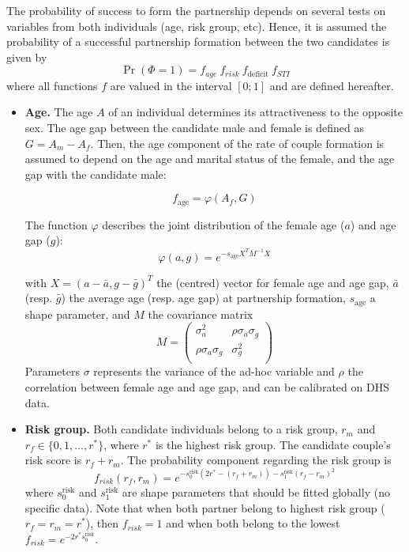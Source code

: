 \documentclass[11pt, onecolumn]{article}
\begin{document}
The probability of success to form the partnership depends on several tests on variables from both individuals (age, risk group, etc). Hence, it is assumed the probability of a successful partnership formation between the two candidates is given by
\begin{equation}
\label{probaFormation}
\Pr(\Phi=1) = f_{age}\ f_{risk}\ f_{\mathrm{deficit}}\ f_{STI}
\end{equation}
where all functions $f$ are valued in the interval $[0;1]$ and are defined hereafter.

\begin{itemize}

\item \textbf{Age.} The age $A$ of an individual determines its attractiveness to the opposite sex.
The age gap between the candidate male and female is defined as $G=A_m-A_f$. Then, the age component of the rate of couple formation is assumed to depend on the age and marital status of the female, and the age gap with the candidate male:

$$f_{\mathrm{age}}= \varphi(A_f,G) $$
 
The function $\varphi$ describes the joint distribution of the female age ($a$)  and age gap ($g$):
$$\varphi(a,g)=e^{-s_{\mathrm{age}} X^T M^{-1} X}$$

with $X=(a-\bar{a},g-\bar{g})^T$ the (centred) vector for female age and age gap, $\bar{a}$ (resp. $\bar{g}$) the average age (resp. age gap) at partnership formation, $s_{\mathrm{age}}$ a shape parameter, and $M$ the covariance matrix
$$M=\begin{pmatrix}
\sigma^2_{a} & \rho\sigma_{a}\sigma_{g} \\
\rho\sigma_{a}\sigma_{g} & \sigma^2_{g} \\
\end{pmatrix}$$
Parameters $\sigma$ represents the variance of the ad-hoc variable and $\rho$ the correlation between female age and age gap, and can be calibrated on DHS data.

\item \textbf{Risk group.} Both candidate individuals belong to a risk group, $r_m$ and $r_f\in \{0,1,...,r^*\}$, where $r^*$ is the highest risk group. The candidate couple's risk score is $r_f+r_m$. The probability component regarding the risk group is
$$f_{risk}(r_f,r_m) = e^{-s^{\mathrm{risk}}_0(2r^*-(r_f+r_m))-s^{\mathrm{risk}}_1(r_f-r_m)^2}$$
where $s^{\mathrm{risk}}_0$ and $s^{\mathrm{risk}}_1$ are shape parameters that should be fitted globally (no specific data). Note that when both partner belong to highest risk group ($r_f=r_m=r^*$), then $f_{risk}=1$ and when both belong to the lowest $f_{risk}=e^{-2r^*s^{\mathrm{risk}}_0}$.


\end{itemize}
\end{document}
